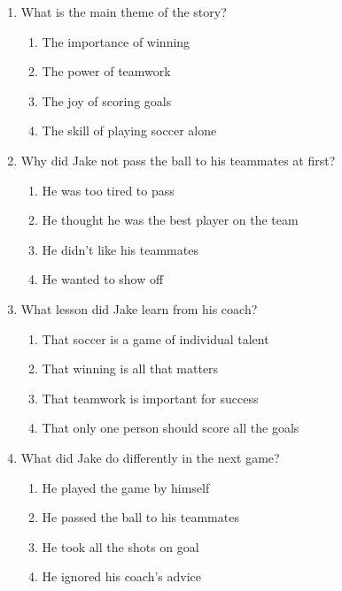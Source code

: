 \documentclass[12pt]{article}
\begin{document}
\begin{enumerate}

    \item What is the main theme of the story?
    \begin{enumerate}[label=\Alph*.]
        \item The importance of winning
        \item The power of teamwork
        \item The joy of scoring goals
        \item The skill of playing soccer alone
    \end{enumerate}
    \vspace{0.5cm}

    \item Why did Jake not pass the ball to his teammates at first?
    \begin{enumerate}[label=\Alph*.]
        \item He was too tired to pass
        \item He thought he was the best player on the team
        \item He didn't like his teammates
        \item He wanted to show off
    \end{enumerate}
    \vspace{0.5cm}


    \item What lesson did Jake learn from his coach?
    \begin{enumerate}[label=\Alph*.]
        \item That soccer is a game of individual talent
        \item That winning is all that matters
        \item That teamwork is important for success
        \item That only one person should score all the goals
    \end{enumerate}
    \vspace{0.5cm}

    \item What did Jake do differently in the next game?
    \begin{enumerate}[label=\Alph*.]
        \item He played the game by himself
        \item He passed the ball to his teammates
        \item He took all the shots on goal
        \item He ignored his coach’s advice
    \end{enumerate}
    \vspace{0.5cm}


\end{enumerate}
\end{document}
